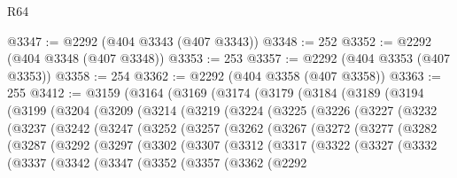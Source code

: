 \begin{lexlean}{R64}
\begin{coremodule}
@3347 := @2292 (@404 @3343 (@407 @3343))
@3348 := 252
@3352 := @2292 (@404 @3348 (@407 @3348))
@3353 := 253
@3357 := @2292 (@404 @3353 (@407 @3353))
@3358 := 254
@3362 := @2292 (@404 @3358 (@407 @3358))
@3363 := 255
@3412 := @3159
    (@3164
      (@3169
        (@3174
          (@3179
            (@3184
              (@3189
                (@3194
                  (@3199
                    (@3204
                      (@3209
                        (@3214
                          (@3219
                            (@3224
                              (@3225
                                (@3226
                                  (@3227
                                    (@3232
                                      (@3237
                                        (@3242
                                          (@3247
                                            (@3252
                                              (@3257
                                                (@3262
                                                  (@3267
                                                    (@3272
                                                      (@3277
                                                        (@3282
                                                          (@3287
                                                            (@3292
                                                              (@3297
                                                                (@3302
                                                                  (@3307
                                                                    (@3312
                                                                      (@3317
                                                                        (@3322
                                                                          (@3327
                                                                            (@3332
                                                                              (@3337
                                                                                (@3342
                                                                                  (@3347
                                                                                    (@3352
                                                                                      (@3357
                                                                                        (@3362
                                                                                          (@2292

\end{coremodule}
\end{lexlean}
